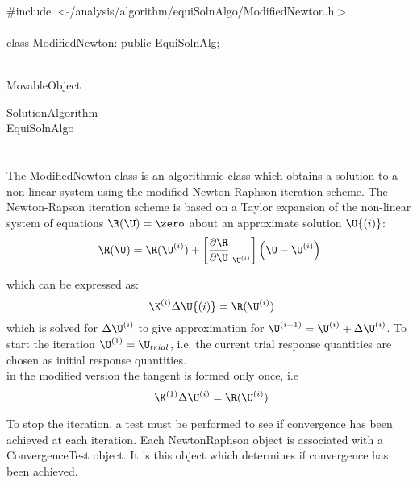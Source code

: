 
   \\
\indent \#include $<\tilde{
}$/analysis/algorithm/equiSolnAlgo/ModifiedNewton.h$>$  \\ 

  \\
class ModifiedNewton: public EquiSolnAlg;  


 \\
MovableObject 

\indent\indent SolutionAlgorithm \\
\indent\indent\indent EquiSolnAlgo \\
\indent\indent\indent{} \\

 \\ 
\indent The ModifiedNewton class is an algorithmic class which obtains a
solution to a non-linear system using the modified Newton-Raphson iteration
scheme. The Newton-Rapson iteration scheme is based on a Taylor expansion of the
non-linear system of equations $\R(\U) = \zero$ about an approximate
solution $\U{(i)}$:
\begin{equation} 
\R(\U) = 
\R(\U^{(i)}) +
\left[ {\frac{\partial \R}{\partial \U} \vert}_{\U^{(i)}}\right]
\left( \U - \U^{(i)} \right) 
\end{equation}

\noindent which can be expressed as:
\begin{equation} \
\K^{(i)}  \Delta \U{(i)} = \R(\U^{(i)})
\end{equation}
which is solved for $\Delta \U^{(i)}$ to give approximation for
$\U^{(i+1)} = \U^{(i)} + \Delta \U^{(i)}$. To start the
iteration $\U^{(1)} = \U_{trial}$, i.e. the current trial
response quantities are chosen as initial response quantities. \\

in the modified version the tangent is formed only once, i.e
\begin{equation} \
\K^{(1)}  \Delta \U^{(i)} = \R(\U^{(i)})
\end{equation}

To stop the iteration, a test must be performed to see if convergence
has been achieved at each iteration. Each NewtonRaphson object is
associated with a ConvergenceTest object. It is this object which
determines if convergence has been achieved. \\

